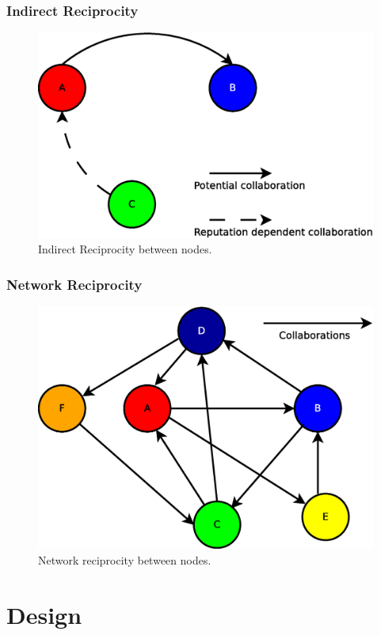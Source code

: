 \documentclass{beamer}
\begin{document}
\begin{frame}
\frametitle{Indirect Reciprocity}
\begin{figure}
	\centerline{\includegraphics[scale=0.3]{images/problem/indirect-reciprocity.eps}}
	\caption{Indirect Reciprocity between nodes.}
	\label{fig:indirect-reciprocity}
\end{figure}
\end{frame}

\begin{frame}
\frametitle{Network Reciprocity}
\begin{figure}
	\centerline{\includegraphics[scale=0.3]{images/problem/network-reciprocity.eps}}
	\caption{Network reciprocity between nodes.}
	\label{fig:network-reciprocity}
\end{figure}
\end{frame}

\section{Design}
\end{document}
